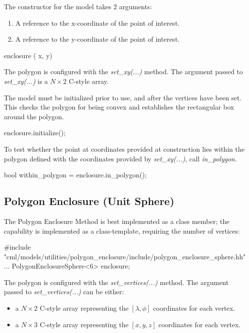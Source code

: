 \documentclass[11pt,fleqn]{report}
\begin{document}
The constructor for the model takes 2 arguments:
\begin{enumerate}
\item A reference to the x-coordinate of the point of interest.
\item A reference to the y-coordinate of the point of interest.
\end{enumerate}

\begin{code}
enclosure ( x, y)
\end{code}

The polygon is configured with the \textit{set\_xy(...)} method.
The argument passed to \textit{set\_xy(...)} is a $N \times 2$ C-style array.
\begin{code}
double enclosure_vertices[6][2] = {...};
...
enclosure.set_xy{ enclosure_vertices);
\end{code}

The model must be initialized prior to use, and after the vertices have been
set. This checks the polygon for being convex and establishes the
rectangular box around the polygon.
\begin{code}
enclosure.initialize();
\end{code}

To test whether the point at coordinates provided at construction lies
within the polygon defined with the coordinates provided by
\textit{set\_xy(...)}, call \textit{in\_polygon}.
\begin{code}
bool within_polygon = enclosure.in_polygon();
\end{code}


\subsection{Polygon Enclosure (Unit Sphere)}
The Polygon Enclosure Method is best implemented as a class member; the
capability is implemented as a class-template, requiring the number of
vertices:
\begin{code}
#include "cml/models/utilities/polygon_enclosure/include/polygon_enclosure_sphere.hh"
...
PolygonEnclosureSphere<6> enclosure;
\end{code}

The polygon is configured with the \textit{set\_vertices(...)} method.
The argument passed to \textit{set\_vertices(...)} can be either:
\begin{itemize}
  \item a $N \times 2$ C-style array representing the $[\lambda, \phi]$ coordinates
    for each vertex.
  \item a $N \times 3$ C-style array representing the $[x,y,z]$ coordinates
    for each vertex.
\end{itemize}
\end{document}
